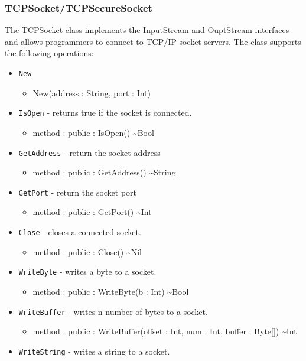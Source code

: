 \documentclass[11pt]{article}
\begin{document}
\subsubsection{TCPSocket/TCPSecureSocket}
The TCPSocket class implements the InputStream and OuptStream
interfaces and allows programmers to connect to TCP/IP socket servers.
The class supports the following operations:
\begin{itemize}
\item \texttt{New}
  \begin{itemize}
  \item New(address : String, port : Int)
  \end{itemize}
\item \texttt{IsOpen} - returns true if the socket is connected.
  \begin{itemize}
  \item method : public : IsOpen() \textasciitilde Bool
  \end{itemize}
\item \texttt{GetAddress} - return the socket address
  \begin{itemize}
  \item method : public : GetAddress() \textasciitilde String
  \end{itemize}
\item \texttt{GetPort} - return the socket port
  \begin{itemize}
  \item method : public : GetPort() \textasciitilde Int
  \end{itemize}
\item \texttt{Close} - closes a connected socket.
  \begin{itemize}
  \item method : public : Close() \textasciitilde Nil
  \end{itemize}
\item \texttt{WriteByte} - writes a byte to a socket.
  \begin{itemize}
  \item method : public : WriteByte(b : Int) \textasciitilde Bool
  \end{itemize}
\item \texttt{WriteBuffer} - writes n number of bytes to a socket.
  \begin{itemize}
  \item method : public : WriteBuffer(offset : Int, num : Int, buffer
    : Byte[]) \textasciitilde Int
  \end{itemize}
\item \texttt{WriteString} - writes a string to a socket.

\end{itemize}
\end{document}
